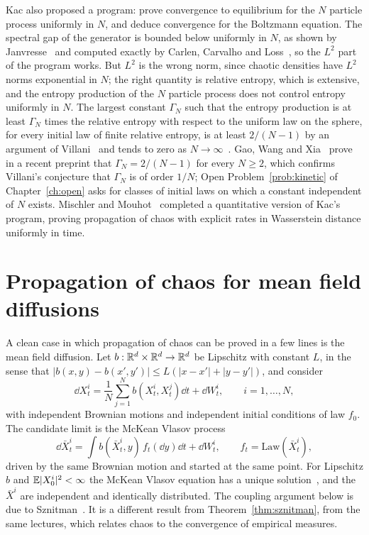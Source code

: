 Kac also proposed a program: prove convergence to equilibrium for the $N$ particle process uniformly in $N$, and deduce convergence for the Boltzmann equation. The spectral gap of the generator is bounded below uniformly in $N$, as shown by Janvresse~\cite{janvresse2001} and computed exactly by Carlen, Carvalho and Loss~\cite{ccl2003}, so the $L^2$ part of the program works. But $L^2$ is the wrong norm, since chaotic densities have $L^2$ norms exponential in $N$; the right quantity is relative entropy, which is extensive, and the entropy production of the $N$ particle process does not control entropy uniformly in $N$. The largest constant $\Gamma_N$ such that the entropy production is at least $\Gamma_N$ times the relative entropy with respect to the uniform law on the sphere, for every initial law of finite relative entropy, is at least $2/(N-1)$ by an argument of Villani~\cite{villani2003cercignani} and tends to zero as $N\to\infty$~\cite{cclv2010}. Gao, Wang and Xia~\cite{gaowangxia2026} prove in a recent preprint that $\Gamma_N = 2/(N-1)$ for every $N\geq2$, which confirms Villani's conjecture that $\Gamma_N$ is of order $1/N$; Open Problem~\ref{prob:kinetic} of Chapter~\ref{ch:open} asks for classes of initial laws on which a constant independent of $N$ exists. Mischler and Mouhot~\cite{mischlermouhot2013} completed a quantitative version of Kac's program, proving propagation of chaos with explicit rates in Wasserstein distance uniformly in time.

\section{Propagation of chaos for mean field diffusions}

A clean case in which propagation of chaos can be proved in a few lines is the mean field diffusion. Let $b:\mathbb{R}^d\times\mathbb{R}^d\to\mathbb{R}^d$ be Lipschitz with constant $L$, in the sense that $|b(x,y)-b(x',y')|\leq L(|x-x'|+|y-y'|)$, and consider
\[
\dd X^i_t = \frac1N\sum_{j=1}^Nb(X^i_t,X^j_t)\dd t+\dd W^i_t,\qquad i = 1,\dots,N,
\]
with independent Brownian motions and independent initial conditions of law $f_0$. The candidate limit is the McKean Vlasov process
\[
\dd\bar X^i_t = \int b(\bar X^i_t,y)\,f_t(\dd y)\dd t+\dd W^i_t,\qquad f_t = \mathrm{Law}(\bar X^i_t),
\]
driven by the same Brownian motion and started at the same point. For Lipschitz $b$ and $\mathbb{E}|X^i_0|^2<\infty$ the McKean Vlasov equation has a unique solution~\cite{sznitman1991}, and the $\bar X^i$ are independent and identically distributed. The coupling argument below is due to Sznitman~\cite{sznitman1991}. It is a different result from Theorem~\ref{thm:sznitman}, from the same lectures, which relates chaos to the convergence of empirical measures.


